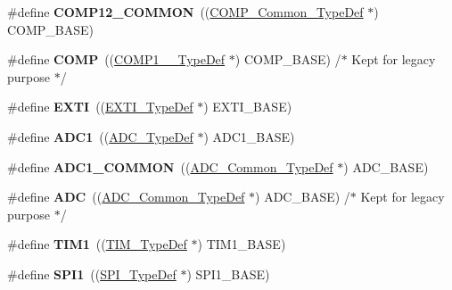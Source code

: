 \begin{DoxyCompactItemize}
\#define {\bfseries C\+O\+M\+P12\+\_\+\+C\+O\+M\+M\+ON}~((\hyperlink{struct_c_o_m_p___common___type_def}{C\+O\+M\+P\+\_\+\+Common\+\_\+\+Type\+Def} $\ast$) C\+O\+M\+P\+\_\+\+B\+A\+SE)
\item 
\mbox{\label{group___peripheral__declaration_ga076912543697dbe4c46b79e8e44ad2fb}} 
\#define {\bfseries C\+O\+MP}~((\hyperlink{struct_c_o_m_p1__2___type_def}{C\+O\+M\+P1\+\_\+\_\+\+Type\+Def} $\ast$) C\+O\+M\+P\+\_\+\+B\+A\+SE) /$\ast$ Kept for legacy purpose $\ast$/
\item 
\mbox{\label{group___peripheral__declaration_ga9189e770cd9b63dadd36683eb9843cac}} 
\#define {\bfseries E\+X\+TI}~((\hyperlink{struct_e_x_t_i___type_def}{E\+X\+T\+I\+\_\+\+Type\+Def} $\ast$) E\+X\+T\+I\+\_\+\+B\+A\+SE)
\item 
\mbox{\label{group___peripheral__declaration_ga90d2d5c526ce5c0a551f533eccbee71a}} 
\#define {\bfseries A\+D\+C1}~((\hyperlink{struct_a_d_c___type_def}{A\+D\+C\+\_\+\+Type\+Def} $\ast$) A\+D\+C1\+\_\+\+B\+A\+SE)
\item 
\mbox{\label{group___peripheral__declaration_gaf1919c64fc774aab31190346fd5457e2}} 
\#define {\bfseries A\+D\+C1\+\_\+\+C\+O\+M\+M\+ON}~((\hyperlink{struct_a_d_c___common___type_def}{A\+D\+C\+\_\+\+Common\+\_\+\+Type\+Def} $\ast$) A\+D\+C\+\_\+\+B\+A\+SE)
\item 
\mbox{\label{group___peripheral__declaration_ga54d148b91f3d356713f7e367a2243bea}} 
\#define {\bfseries A\+DC}~((\hyperlink{struct_a_d_c___common___type_def}{A\+D\+C\+\_\+\+Common\+\_\+\+Type\+Def} $\ast$) A\+D\+C\+\_\+\+B\+A\+SE) /$\ast$ Kept for legacy purpose $\ast$/
\item 
\mbox{\label{group___peripheral__declaration_ga2e87451fea8dc9380056d3cfc5ed81fb}} 
\#define {\bfseries T\+I\+M1}~((\hyperlink{struct_t_i_m___type_def}{T\+I\+M\+\_\+\+Type\+Def} $\ast$) T\+I\+M1\+\_\+\+B\+A\+SE)
\item 
\mbox{\label{group___peripheral__declaration_gad483be344a28ac800be8f03654a9612f}} 
\#define {\bfseries S\+P\+I1}~((\hyperlink{struct_s_p_i___type_def}{S\+P\+I\+\_\+\+Type\+Def} $\ast$) S\+P\+I1\+\_\+\+B\+A\+SE)

\end{DoxyCompactItemize}
